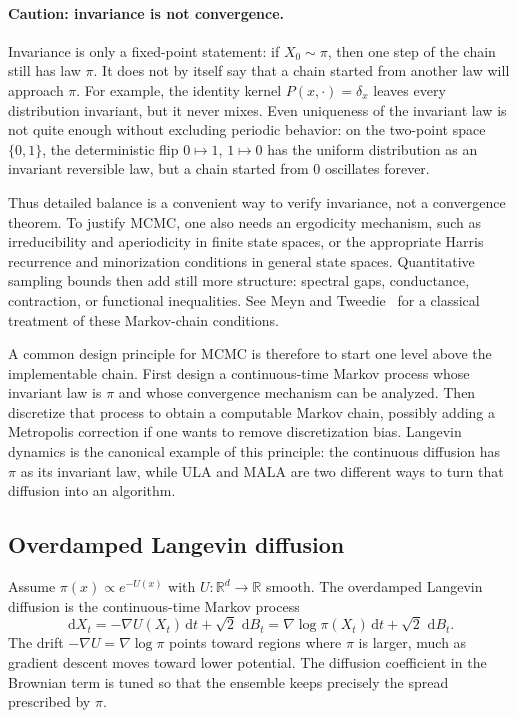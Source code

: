 \documentclass[10pt,a4paper]{amsart}
\numberwithin{equation}{section}
\newcommand{\R}{\mathbb{R}}
\newcommand{\dd}{\,\mathrm{d}}
\begin{document}
\paragraph{Caution: invariance is not convergence.}
Invariance is only a fixed-point statement: if $X_0\sim\pi$, then one step of
the chain still has law $\pi$.  It does not by itself say that a chain started
from another law will approach $\pi$.  For example, the identity kernel
$P(x,\cdot)=\delta_x$ leaves every distribution invariant, but it never mixes.
Even uniqueness of the invariant law is not quite enough without excluding
periodic behavior: on the two-point space $\{0,1\}$, the deterministic flip
$0\mapsto1$, $1\mapsto0$ has the uniform distribution as an invariant reversible
law, but a chain started from $0$ oscillates forever.

Thus detailed balance is a convenient way to verify invariance, not a
convergence theorem.  To justify MCMC, one also needs an ergodicity mechanism,
such as irreducibility and aperiodicity in finite state spaces, or the
appropriate Harris recurrence and minorization conditions in general state
spaces.  Quantitative sampling bounds then add still more structure: spectral
gaps, conductance, contraction, or functional inequalities.  See Meyn and
Tweedie~\cite{meyn2009markov} for a classical treatment of these Markov-chain
conditions.

A common design principle for MCMC is therefore to start one level above the
implementable chain.  First design a continuous-time Markov process whose
invariant law is $\pi$ and whose convergence mechanism can be analyzed.  Then
discretize that process to obtain a computable Markov chain, possibly adding a
Metropolis correction if one wants to remove discretization bias.  Langevin
dynamics is the canonical example of this principle: the continuous diffusion
has $\pi$ as its invariant law, while ULA and MALA are two different ways to
turn that diffusion into an algorithm.

\subsection{Overdamped Langevin diffusion}

Assume $\pi(x)\propto e^{-U(x)}$ with $U:\R^d\to\R$ smooth.  The overdamped
Langevin diffusion is the continuous-time Markov process
\begin{equation}\label{eq:langevin}
    \dd X_t = -\nabla U(X_t)\dd t+\sqrt{2}\,\dd B_t
    = \nabla\log\pi(X_t)\dd t+\sqrt{2}\,\dd B_t.
\end{equation}
The drift
$-\nabla U=\nabla\log\pi$ points toward regions where $\pi$ is larger, much as
gradient descent moves toward lower potential.  The diffusion coefficient in
the Brownian term is tuned so that the ensemble keeps precisely the spread
prescribed by $\pi$.
\end{document}
